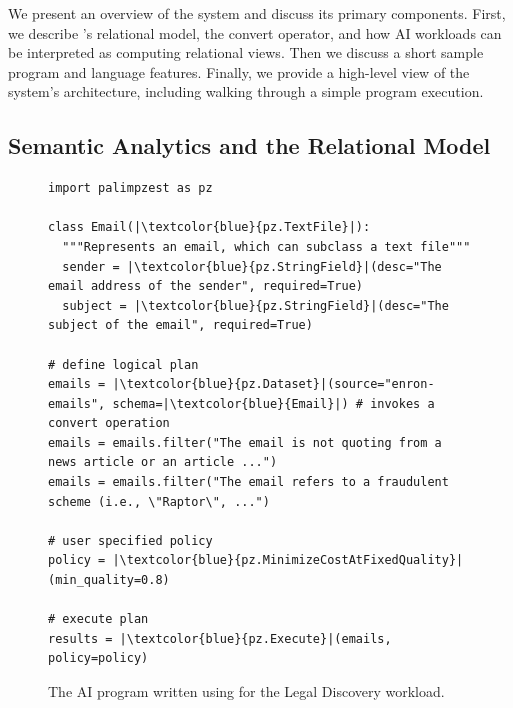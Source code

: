 We present an overview of the \system{} system and discuss its primary components. 
First, we describe \system{}'s relational model, the convert operator, and how AI workloads can be interpreted as computing relational views. Then we discuss a short sample program and language features.  Finally, we provide a high-level view of the system's architecture, including walking through a simple program execution.

\subsection{Semantic Analytics and the Relational Model}
\begin{figure}
  \centering %
  \begin{verbatim}
import palimpzest as pz

class Email(|\textcolor{blue}{pz.TextFile}|):
  """Represents an email, which can subclass a text file"""
  sender = |\textcolor{blue}{pz.StringField}|(desc="The email address of the sender", required=True)
  subject = |\textcolor{blue}{pz.StringField}|(desc="The subject of the email", required=True)

# define logical plan
emails = |\textcolor{blue}{pz.Dataset}|(source="enron-emails", schema=|\textcolor{blue}{Email}|) # invokes a convert operation
emails = emails.filter("The email is not quoting from a news article or an article ...")
emails = emails.filter("The email refers to a fraudulent scheme (i.e., \"Raptor\", ...")

# user specified policy
policy = |\textcolor{blue}{pz.MinimizeCostAtFixedQuality}|(min_quality=0.8)

# execute plan
results = |\textcolor{blue}{pz.Execute}|(emails, policy=policy)
    \end{verbatim}
  \caption{The AI program written using \system{} for the Legal Discovery workload.}
  \label{fig:enron-email-program}
\end{figure}
    

